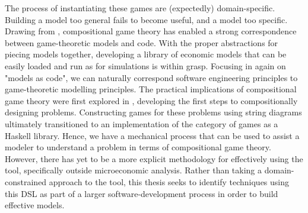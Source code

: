 The process of instantiating these games are (expectedly) domain-specific. Building a model too general fails to become useful, and a model too specific. Drawing from \cite{Zahn2024}, compositional game theory has enabled a strong correspondence between game-theoretic models and code. With the proper abstractions for piecing models together, developing a library of economic models that can be easily loaded and run as for simulations is within grasp. Focusing in again on "models as code", we can naturally correspond software engineering principles to game-theoretic modelling principles. The practical implications of compositional game theory were first explored in \cite[section 2.3.12]{HedgesThesis}, developing the first steps to compositionally designing problems. Constructing games for these problems using string diagrams ultimately transitioned to an implementation of the category of games as a Haskell library. Hence, we have a mechanical process that can be used to assist a modeler to understand a problem in terms of compositional game theory. However, there has yet to be a more explicit methodology for effectively using the tool, specifically outside microeconomic analysis. Rather than taking a domain-constrained approach to the tool, this thesis seeks to identify techniques using this DSL as part of a larger software-development process in order to build effective models.






